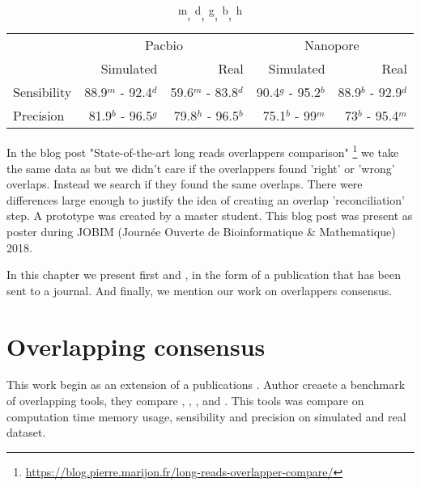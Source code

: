 \documentclass[main.tex]{subfiles}
\begin{document}
\begin{table}[ht]
    \centering
    \begin{tabular}{l|rr|rr}
                & \multicolumn{2}{c}{Pacbio}                & \multicolumn{2}{c}{Nanopore}              \\ 
                & Simulated           & Real                & Simulated         & Real                  \\ \hline
    Sensibility & 88.9$^m$ - 92.4$^d$ & 59.6$^m$ - 83.8$^d$ & 90.4$^g$ - 95.2$^b$ & 88.9$^b$ - 92.9$^d$ \\
    Precision   & 81.9$^b$ - 96.5$^g$ & 79.8$^h$ - 96.5$^b$ & 75.1$^b$ - 99$^m$   & 73$^b$ - 95.4$^m$   \\
    \end{tabular}
    \caption{\textsuperscript{m}, \textsuperscript{d}, \textsuperscript{g}, \textsuperscript{b}, \textsuperscript{h}\mhap}
    \label{preassembly:tab:ovl_result}
\end{table}

In the blog post "State-of-the-art long reads overlappers comparison" \footnote{\url{https://blog.pierre.marijon.fr/long-reads-overlapper-compare/}} we take  the same data as \cite{ovl_bench} but we didn't care if the overlappers found 'right' or 'wrong' overlaps. Instead we search if they found the same overlaps. There were differences large enough to justify the idea of creating an overlap 'reconciliation' step. A prototype was created by a master student. 
This blog post was present as poster during JOBIM (Journée Ouverte de Bioinformatique \& Mathematique) 2018.

In this chapter we present first \yacrd and \fpa, in the form of a publication that has been sent to a journal. And finally, we mention our work on overlappers consensus.


%


\section{Overlapping consensus}\label{section:preassembly:ovl_consensus}

This work begin as an extension of a \citeauthor{bench_ovl} publications \cite{bench_ovl}. Author creaete a benchmark of overlapping tools, they compare \mhap, \minimap, \cite{blasr}, \cite{daligner} and \cite{graphmap}. This tools was compare on computation time memory usage, sensibility and precision on simulated and real dataset.
\end{document}
